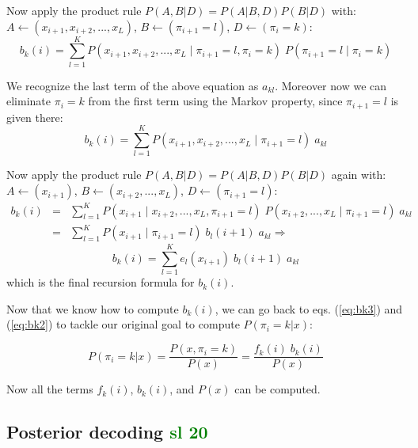 Now apply the product rule $P(A,B|D) = P(A|B,D) P(B|D)$ with: \\
$A \leftarrow (x_{i+1}, x_{i+2}, ..., x_L)$,
$B \leftarrow (\pi_{i+1}=l)$,
$D \leftarrow (\pi_i=k)$:
%
\begin{equation}
b_k(i) = \sum_{l=1}^K P(x_{i+1}, x_{i+2}, ..., x_L \; | \; \pi_{i+1}=l, \pi_i=k) \;
                         P(\pi_{i+1}=l \; | \; \pi_i=k)
\end{equation}

We recognize the last term of the above equation as $a_{kl}$. Moreover now we can eliminate $\pi_i=k$ from the first term using the Markov property, since $\pi_{i+1}=l$ is given there:
\begin{equation}
b_k(i) = \sum_{l=1}^K P(x_{i+1}, x_{i+2}, ..., x_L \; | \; \pi_{i+1}=l) \; a_{kl}
\end{equation}

Now apply the product rule $P(A,B|D) = P(A|B,D) P(B|D)$ again with: \\
$A \leftarrow (x_{i+1})$,
$B \leftarrow (x_{i+2}, ..., x_L)$,
$D \leftarrow (\pi_{i+1}=l)$:
%
\begin{eqnarray}
b_k(i) & = & \sum_{l=1}^K 
P(x_{i+1} \; | \; x_{i+2}, ..., x_L, \pi_{i+1}=l)  \;
P(x_{i+2}, ..., x_L \; | \; \pi_{i+1}=l) 
\; a_{kl}
\nonumber \\
& = &  \sum_{l=1}^K 
P(x_{i+1} \; | \; \pi_{i+1}=l) \;
b_l(i+1)
\; a_{kl}
\Rightarrow
\nonumber
\end{eqnarray}
%
\begin{equation}
\boxed{b_k(i) =  \sum_{l=1}^K  e_l(x_{i+1}) \; b_l(i+1) \; a_{kl}}
\end{equation}
which is the final recursion formula for $b_k(i)$.

Now that we know how to compute $b_k(i)$, we can go back to eqs. (\ref{eq:bk3}) and (\ref{eq:bk2}) to tackle our original goal to compute $P(\pi_i = k | x)$:

\begin{equation}
\boxed{P(\pi_i = k | x) = \frac{P(x, \pi_i = k)}{P(x)} 
                        = \frac{f_k(i) \; b_k(i)}{P(x)}}
\end{equation}

Now all the terms $f_k(i)$, $b_k(i)$, and $P(x)$ can be computed.

\subsection{Posterior decoding \textcolor{green}{sl 20}}

